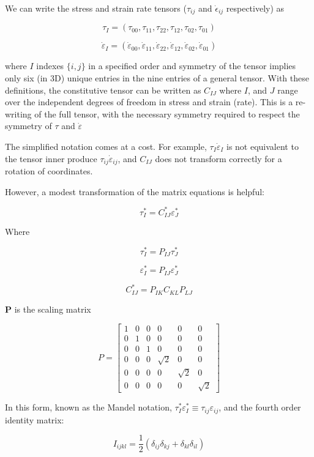 \documentclass[
  letterpaper,
  DIV=11,
  numbers=noendperiod]{scrreprt}
\begin{document}
We can write the stress and strain rate tensors (\(\tau_{ij}\) and
\(\dot\epsilon_{ij}\) respectively) as

\[ \tau_I = \left( \tau_{00}, \tau_{11}, \tau_{22}, \tau_{12}, \tau_{02}, \tau_{01} \right) \]

\[ \dot\varepsilon_I = \left( \dot\varepsilon_{00}, \dot\varepsilon_{11}, \dot\varepsilon_{22}, \dot\varepsilon_{12}, \dot\varepsilon_{02}, \dot\varepsilon_{01} \right) \]

where \(I\) indexes \(\{i,j\}\) in a specified order and symmetry of the
tensor implies only six (in 3D) unique entries in the nine entries of a
general tensor. With these definitions, the constitutive tensor can be
written as \(C_{IJ}\) where \(I\), and \(J\) range over the independent
degrees of freedom in stress and strain (rate). This is a re-writing of
the full tensor, with the necessary symmetry required to respect the
symmetry of \(\tau\) and \(\dot\varepsilon\)

The simplified notation comes at a cost. For example,
\(\tau_I \dot\varepsilon_I\) is not equivalent to the tensor inner
produce \(\tau_{ij} \dot\varepsilon_{ij}\), and \(C_{IJ}\) does not
transform correctly for a rotation of coordinates.

However, a modest transformation of the matrix equations is helpful:

\[ \tau^*_{I} = C^*_{IJ} \varepsilon^*_{J} \]

Where

\[\tau^*_{I} = P_{IJ} \tau^*_J\]

\[\varepsilon^*_I = P_{IJ} \varepsilon^*_J\]

\[C^*_{IJ} = P_{IK} C_{KL} P_{LJ}\]

\(\mathbf{P}\) is the scaling matrix

\[P = \left[\begin{matrix}1 & 0 & 0 & 0 & 0 & 0\\0 & 1 & 0 & 0 & 0 & 0\\0 & 0 & 1 & 0 & 0 & 0\\0 & 0 & 0 & \sqrt{2} & 0 & 0\\0 & 0 & 0 & 0 & \sqrt{2} & 0\\0 & 0 & 0 & 0 & 0 & \sqrt{2}\end{matrix}\right]\]

In this form, known as the Mandel notation,
\(\tau^*_I\varepsilon^*_I \equiv \tau_{ij} \varepsilon_{ij}\), and the
fourth order identity matrix:

\[I_{ijkl} = \frac{1}{2} \left( \delta_{ij}\delta_{kj} + \delta_{kl}\delta_{il} \right)\]
\end{document}
